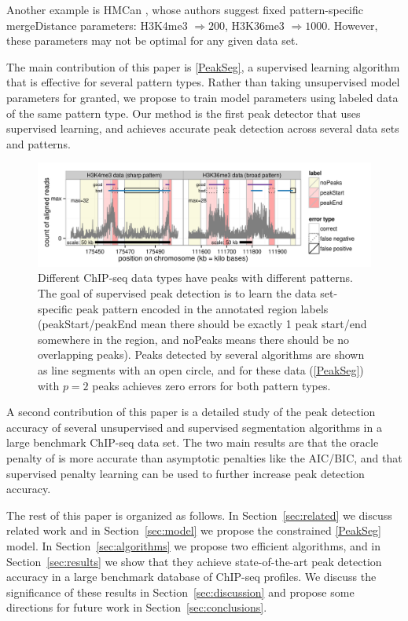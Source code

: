 \documentclass{article}
\begin{document}
Another example is HMCan \citep{HMCan}, whose authors suggest fixed
pattern-specific mergeDistance parameters: H3K4me3 $\Rightarrow 200$,
H3K36me3 $\Rightarrow 1000$. However, these parameters may not be
optimal for any given data set.

The main contribution of this paper is \ref{PeakSeg}, a supervised
learning algorithm that is effective for several pattern types. Rather
than taking unsupervised model parameters for granted, we propose to
train model parameters using labeled data of the same pattern
type. Our method is the first peak detector that uses supervised
learning, and achieves accurate peak detection across several data
sets and patterns.

\begin{figure}[b!]
  \centering
  \includegraphics[width=\textwidth]{figure-dp-peaks-train}
  \vskip -0.5cm
  \caption{Different ChIP-seq data types have peaks with different
    patterns. The goal of supervised peak detection is to learn the
    data set-specific peak pattern encoded in the annotated region
    labels (peakStart/peakEnd mean there should be exactly 1 peak
    start/end somewhere in the region, and noPeaks means there should
    be no overlapping peaks). Peaks detected by several algorithms are
    shown as line segments with an open circle, and for these data
    (\ref{PeakSeg}) with $p=2$ peaks achieves zero errors for both
    pattern types.}
  \label{fig:dp-peaks-train}
\end{figure}

A second contribution of this paper is a detailed study of the peak
detection accuracy of several unsupervised and supervised segmentation
algorithms in a large benchmark ChIP-seq data set. The two main
results are that the oracle penalty of \citet{cleynen2013segmentation}
is more accurate than asymptotic penalties like the AIC/BIC, and that
supervised penalty learning can be used to further increase peak
detection accuracy.

The rest of this paper is organized as follows. In
Section~\ref{sec:related} we discuss related work and in
Section~\ref{sec:model} we propose the constrained \ref{PeakSeg}
model. In Section~\ref{sec:algorithms} we propose two efficient
algorithms, and in Section~\ref{sec:results} we show that they achieve
state-of-the-art peak detection accuracy in a large benchmark database
of ChIP-seq profiles. We discuss the significance of these results in
Section~\ref{sec:discussion} and propose some directions for future
work in Section~\ref{sec:conclusions}.
\end{document}
